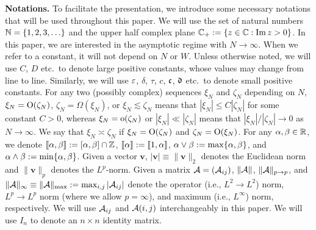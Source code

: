 \medskip
{\noindent \bf Notations.}
To facilitate the presentation, we introduce some necessary notations that will be used throughout this paper. We will use the set of natural numbers $\N=\{1,2,3,\ldots\}$ and the upper half complex plane $\C_+:=\{z\in \C:\im z>0\}$.  
In this paper, we are interested in the asymptotic regime with $N\to \infty$. When we refer to a constant, it will not depend on $N$ or $W$. Unless otherwise noted, we will use $C$, $D$ etc.~to denote large positive constants, whose values may change from line to line. Similarly, we will use $\e$, $\delta$, $\tau$, $c$, $\fc$, $\fd$ etc.~to denote small positive constants. 
For any two (possibly complex) sequences $\xi_N$ and $\zeta_N$ depending on $N$, $\xi_N = \OO(\zeta_N)$, $\zeta_N=\Omega(\xi_N)$, or $\xi_N \lesssim \zeta_N$ means that $|\xi_N| \le C|\zeta_N|$ for some constant $C>0$, whereas $\xi_N=\oo(\zeta_N)$ or $|\xi_N|\ll |\zeta_N|$ means that $|\xi_N| /|\zeta_N| \to 0$ as $N\to \infty$. We say that $\xi_N \asymp \zeta_N$ if $\xi_N = \OO(\zeta_N)$ and $\zeta_N = \OO(\xi_N)$. For any $\al,\beta\in\R$, we denote $\qqq{\al, \beta}:= [\al,\beta]\cap {\mathbb Z}$, $\qqq{\al}:=\qqq{1,\al}$, $\al\vee \beta:=\max\{\al, \beta\}$, and $\al\wedge \beta:=\min\{\al, \beta\}$. 
Given a vector $\mathbf v$, $|\mathbf v|\equiv \|\mathbf v\|_2$ denotes the Euclidean norm and $\|\mathbf v\|_p$ denotes the $L^p$-norm. 
Given a matrix $\cal A = (\cal A_{ij})$, $\|\cal A\|$, $\|\cal A\|_{p\to p}$, and $\|\cal A\|_{\infty}\equiv \|\cal A\|_{\max}:=\max_{i,j}|\cal A_{ij}|$ denote the operator (i.e., $L^2\to L^2$) norm,  $L^p\to L^p$ norm (where we allow $p=\infty$), and maximum (i.e., $L^\infty$) norm, respectively. We will use $\cal A_{ij}$ and $ \cal A(i,j)$ interchangeably in this paper. %
We will use $I_n$ to denote an $n\times n$ identity matrix.

